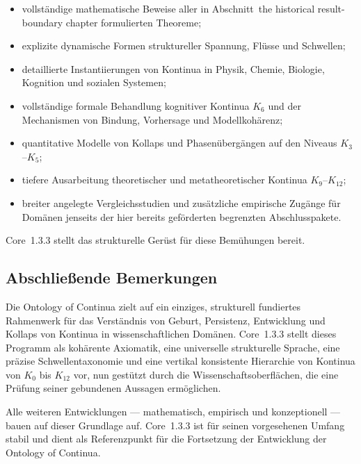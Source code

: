 \begin{itemize}
    \item vollständige mathematische Beweise aller in
          Abschnitt~the historical result-boundary chapter formulierten Theoreme;
    \item explizite dynamische Formen struktureller Spannung, Flüsse und
          Schwellen;
    \item detaillierte Instantiierungen von Kontinua in Physik, Chemie,
          Biologie, Kognition und sozialen Systemen;
    \item vollständige formale Behandlung kognitiver Kontinua \(K_6\) und der
          Mechanismen von Bindung, Vorhersage und Modellkohärenz;
    \item quantitative Modelle von Kollaps und Phasenübergängen auf den Niveaus
          \(K_3\)–\(K_5\);
    \item tiefere Ausarbeitung theoretischer und metatheoretischer Kontinua
          \(K_9\)–\(K_{12}\);
    \item breiter angelegte Vergleichsstudien und zusätzliche empirische
          Zugänge für Domänen jenseits der hier bereits geförderten begrenzten
          Abschlusspakete.
\end{itemize}

Core~1.3.3 stellt das strukturelle Gerüst für diese Bemühungen bereit.

\subsection{Abschließende Bemerkungen}

Die Ontology of Continua zielt auf ein einziges, strukturell fundiertes
Rahmenwerk für das Verständnis von Geburt, Persistenz, Entwicklung und Kollaps
von Kontinua in wissenschaftlichen Domänen.
Core~1.3.3 stellt dieses Programm als kohärente Axiomatik, eine universelle
strukturelle Sprache, eine präzise Schwellentaxonomie und eine vertikal
konsistente Hierarchie von Kontinua von \(K_0\) bis \(K_{12}\) vor,
nun gestützt durch die Wissenschaftsoberflächen, die eine Prüfung seiner
gebundenen Aussagen ermöglichen.

Alle weiteren Entwicklungen --- mathematisch, empirisch und konzeptionell ---
bauen auf dieser Grundlage auf. Core~1.3.3 ist für seinen vorgesehenen Umfang
stabil und dient als Referenzpunkt für die Fortsetzung der Entwicklung der
Ontology of Continua.
